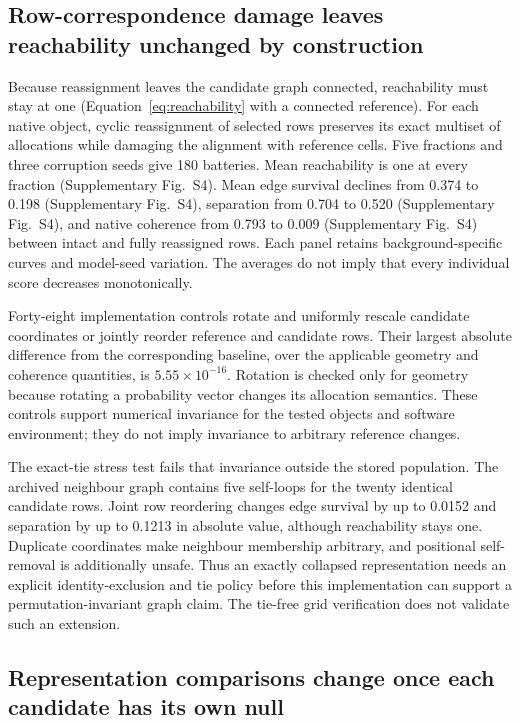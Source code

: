 \documentclass[11pt]{article}
\begin{document}
\subsection{Row-correspondence damage leaves reachability unchanged by construction}

Because reassignment leaves the candidate graph connected, reachability must stay at one (Equation~\ref{eq:reachability} with a connected reference). For each native object, cyclic reassignment of selected rows preserves its exact multiset of allocations while damaging the alignment with reference cells. Five fractions and three corruption seeds give 180 batteries. Mean reachability is one at every fraction (Supplementary Fig.~S4). Mean edge survival declines from 0.374 to 0.198 (Supplementary Fig.~S4), separation from 0.704 to 0.520 (Supplementary Fig.~S4), and native coherence from 0.793 to 0.009 (Supplementary Fig.~S4) between intact and fully reassigned rows. Each panel retains background-specific curves and model-seed variation. The averages do not imply that every individual score decreases monotonically.



Forty-eight implementation controls rotate and uniformly rescale candidate coordinates or jointly reorder reference and candidate rows. Their largest absolute difference from the corresponding baseline, over the applicable geometry and coherence quantities, is $5.55\times10^{-16}$. Rotation is checked only for geometry because rotating a probability vector changes its allocation semantics. These controls support numerical invariance for the tested objects and software environment; they do not imply invariance to arbitrary reference changes.

The exact-tie stress test fails that invariance outside the stored population. The archived neighbour graph contains five self-loops for the twenty identical candidate rows. Joint row reordering changes edge survival by up to 0.0152 and separation by up to 0.1213 in absolute value, although reachability stays one. Duplicate coordinates make neighbour membership arbitrary, and positional self-removal is additionally unsafe. Thus an exactly collapsed representation needs an explicit identity-exclusion and tie policy before this implementation can support a permutation-invariant graph claim. The tie-free grid verification does not validate such an extension.

\subsection{Representation comparisons change once each candidate has its own null}
\end{document}
